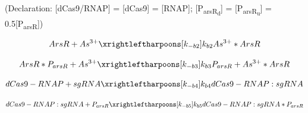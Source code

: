 (Declaration: [dCas9/RNAP] = [dCas9] = [RNAP]; [P\textsubscript{arsR\textsubscript{d}}] = [P\textsubscript{arsR\textsubscript{u}}] = 0.5{[P\textsubscript{arsR}]})

\begin{equation}
ArsR +As^{3+}\xrightleftharpoons[k_{-b2}]{k_{b2}}As^{3+}*ArsR
\end{equation}

\begin{equation}
ArsR*P_{arsR} +As^{3+}\xrightleftharpoons[k_{-b3}]{k_{b3}}P_{arsR}+ As^{3+}*ArsR
\end{equation}

\begin{equation}
dCas9-RNAP+sgRNA\xrightleftharpoons[k_{-b4}]{k_{b4}} dCas9-RNAP:sgRNA
\end{equation}

\begin{equation}
dCas9-RNAP:sgRNA+P_{arsR}\xrightleftharpoons[k_{-b5}]{k_{b5}} dCas9-RNAP:sgRNA*P_{arsR}
\end{equation}

